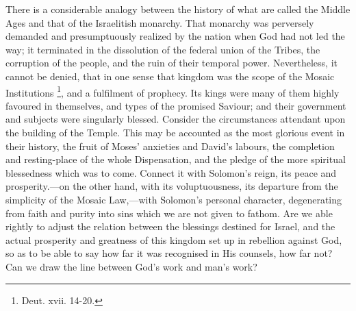 There is a considerable analogy between the history of what are
called the Middle Ages and that of the Israelitish monarchy. That
monarchy was perversely demanded and presumptuously realized by the
nation when God had not led the way; it terminated in the dissolution of
the federal union of the Tribes, the corruption of the people, and the
ruin of their temporal power. Nevertheless, it cannot be denied, that in
one sense that kingdom was the scope of the Mosaic Institutions \footnote{Deut. xvii. 14-20.}, and a fulfilment of prophecy. Its kings were many of them
highly favoured in themselves, and types of the promised Saviour; and
their government and subjects were singularly blessed. Consider the
circumstances attendant upon the building of the Temple. This may be
accounted as the most glorious event in their history, the fruit of
Moses' anxieties and David's labours, the completion and resting-place
of the whole Dispensation, and the pledge of the more spiritual
blessedness which was to come. Connect it with Solomon's reign, its
peace and prosperity.—on the other hand, with its voluptuousness, its
departure from the simplicity of the Mosaic Law,—with Solomon's
personal character, degenerating from faith and purity into sins which
we are not given to fathom. Are we able rightly to adjust the relation
between the blessings destined for Israel, and the actual prosperity and
greatness of this kingdom set up in rebellion against God, so as to be
able to say how far it was recognised in His counsels, how far not? Can
we draw the line between God's work and man's work?

